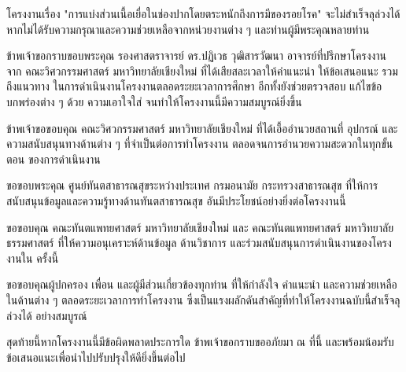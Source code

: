 \begin{acknowledgments}
โครงงานเรื่อง "การแบ่งส่วนเนื้อเยื่อในช่องปากโดยตระหนักถึงการมีของรอยโรค" จะไม่สําเร็จลุล่วงได้ หากไม่ได้รับความกรุณาและความช่วยเหลือจากหน่วยงานต่าง ๆ และท่านผู้มีพระคุณหลายท่าน

ข้าพเจ้าขอกราบขอบพระคุณ รองศาสตราจารย์ ดร.ปฏิเวธ วุฒิสารวัฒนา อาจารย์ที่ปรึกษาโครงงาน จาก
คณะวิศวกรรมศาสตร์ มหาวิทยาลัยเชียงใหม่ ที่ได้เสียสละเวลาให้คําแนะนํา ให้ข้อเสนอแนะ รวมถึงแนวทาง
ในการดําเนินงานโครงงานตลอดระยะเวลาการศึกษา อีกทั้งยังช่วยตรวจสอบ แก้ไขข้อบกพร่องต่าง ๆ ด้วย
ความเอาใจใส่ จนทําให้โครงงานนี้มีความสมบูรณ์ยิ่งขึ้น

ข้าพเจ้าขอขอบคุณ คณะวิศวกรรมศาสตร์ มหาวิทยาลัยเชียงใหม่ ที่ได้เอื้ออํานวยสถานที่ อุปกรณ์ และ
ความสนับสนุนทางด้านต่าง ๆ ที่จําเป็นต่อการทําโครงงาน ตลอดจนการอํานวยความสะดวกในทุกขั้นตอน
ของการดําเนินงาน

ขอขอบพระคุณ ศูนย์ทันตสาธารณสุขระหว่างประเทศ กรมอนามัย กระทรวงสาธารณสุข ที่ให้การสนับสนุนข้อมูลและความรู้ทางด้านทันตสาธารณสุข อันมีประโยชน์อย่างยิ่งต่อโครงงานนี้

ขอขอบคุณ คณะทันตแพทยศาสตร์ มหาวิทยาลัยเชียงใหม่ และ คณะทันตแพทยศาสตร์ มหาวิทยาลัย
ธรรมศาสตร์ ที่ให้ความอนุเคราะห์ด้านข้อมูล ด้านวิชาการ และร่วมสนับสนุนการดําเนินงานของโครงงานใน
ครั้งนี้

ขอขอบคุณผู้ปกครอง เพื่อน และผู้มีส่วนเกี่ยวข้องทุกท่าน ที่ให้กําลังใจ คําแนะนํา และความช่วยเหลือ
ในด้านต่าง ๆ ตลอดระยะเวลาการทําโครงงาน ซึ่งเป็นแรงผลักดันสําคัญที่ทําให้โครงงานฉบับนี้สําเร็จลุล่วงได้
อย่างสมบูรณ์

สุดท้ายนี้หากโครงงานนี้มีข้อผิดพลาดประการใด ข้าพเจ้าขอกราบขออภัยมา ณ ที่นี้ และพร้อมน้อมรับ
ข้อเสนอแนะเพื่อนําไปปรับปรุงให้ดียิ่งขึ้นต่อไป

\end{acknowledgments}%
\fi %

\contentspage

\ifproject
\figurelistpage

\tablelistpage
\fi %



